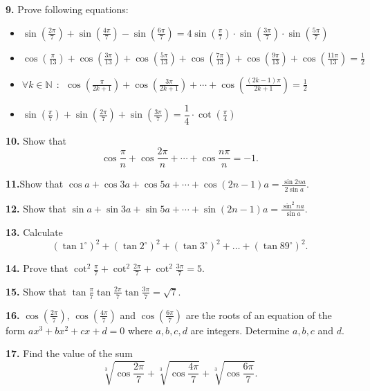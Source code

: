 \documentclass{article}
\begin{document}
\noindent
{\bf 9.} Prove following equations:

\begin{itemize}

\item $\sin \left(\frac{2\pi}{7}\right)+\sin \left(\frac{4\pi}{7}\right) - \sin \left(\frac{6\pi}{7}\right)= 4 \sin \left(\frac{\pi}{7}\right) \cdot \sin \left(\frac{3\pi}{7}\right) \cdot \sin \left(\frac{5\pi}{7}\right)$

\item $\cos \left(\frac{\pi}{13}\right)+\cos \left(\frac{3\pi}{13}\right)+\cos \left(\frac{5\pi}{13}\right)+\cos \left(\frac{7\pi}{13}\right)+\cos \left(\frac{9\pi}{13}\right)+\cos \left(\frac{11\pi}{13}\right)=\frac12$

\item $\forall k \in \mathbb N \: \: : \: \: \cos \left(\frac{\pi}{2k+1}\right)+\cos \left(\frac{3\pi}{2k+1}\right)+\cdots +\cos \left(\frac{(2k-1)\pi}{2k+1}\right)=\frac12$

\item $\sin \left(\frac{\pi}{7}\right)+\sin \left(\frac{2\pi}{7}\right)+\sin \left(\frac{3\pi}{7}\right)=\dfrac 14 \cdot \cot \left(\frac{\pi}{4}\right)$

\end{itemize}


\noindent
{\bf 10.} Show that
\[\cos \frac{\pi}{n}  + \cos \frac{2 \pi}{n}+ \cdots + \cos \frac{n \pi}{n} = -1.\]

\noindent
{\bf 11.}Show that $\cos a + \cos 3a + \cos 5a + \cdots + \cos(2n - 1)a = \frac{\sin 2na}{2 \sin a}.$


\noindent
{\bf 12.} Show that $\sin a + \sin 3a + \sin 5a + \cdots + \sin(2n- 1)a = \frac{\sin^2 na}{\sin a}.$

\noindent
{\bf 13.} Calculate
\[(\tan1^\circ)^2+(\tan2^\circ)^2+(\tan3^\circ)^2+\ldots+(\tan89^\circ)^2.\]

\noindent
{\bf 14.} Prove that $\cot^2 \frac{\pi}{7}+\cot^2 \frac{2\pi}{7}+\cot^2 \frac{3\pi}{7}=5$.

\noindent
{\bf 15.} Show that $\tan{\frac {\pi}7}\tan{\frac {2\pi}7}\tan{\frac {3\pi}7}=\sqrt 7$.

\singlespacing
\noindent
{\bf 16.} $\cos\left(\frac{2\pi}{7}\right)$, $\cos\left(\frac{4\pi}{7}\right)$ and $\cos\left(\frac{6\pi}{7}\right)$ are the roots of an equation of the form $ax^3+bx^2+cx+d = 0$ where $a, b, c, d$ are integers. Determine $a, b, c$ and $d$.

\doublespacing
\noindent
{\bf *17.} Find the value of the sum
\[\sqrt[3]{\cos{\frac{2\pi}{7}}} + \sqrt[3]{\cos\frac{4\pi}{7}} + \sqrt[3]{\cos\frac{6\pi}{7}}.\]
\end{document}
